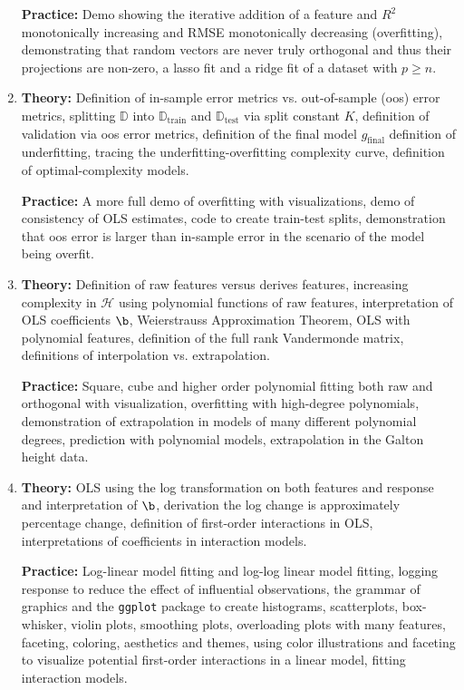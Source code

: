 \begin{enumerate}[(1)]
\textbf{Practice:} Demo showing the iterative addition of a feature and $R^2$ monotonically increasing and RMSE monotonically decreasing (overfitting), demonstrating that random vectors are never truly orthogonal and thus their projections are non-zero, a lasso fit and a ridge fit of a dataset with $p \geq n$.

\item \textbf{Theory:} Definition of in-sample error metrics vs. out-of-sample (oos) error metrics, splitting $\mathbb{D}$ into $\mathbb{D}_{\text{train}}$ and $\mathbb{D}_{\text{test}}$ via split constant $K$, definition of  validation via oos error metrics, definition of the final model $g_{\text{final}}$ definition of underfitting, tracing the underfitting-overfitting complexity curve, definition of optimal-complexity models.

\textbf{Practice:} A more full demo of overfitting with visualizations, demo of consistency of OLS estimates, code to create train-test splits, demonstration that oos error is larger than in-sample error in the scenario of the model being overfit.

\item \textbf{Theory:} Definition of raw features versus derives features, increasing complexity in $\mathcal{H}$ using polynomial functions of raw features, interpretation of OLS coefficients $\b$, Weierstrauss Approximation Theorem, OLS with polynomial features, definition of the full rank Vandermonde matrix, definitions of interpolation vs. extrapolation.

\textbf{Practice:} Square, cube and higher order polynomial fitting both raw and orthogonal with visualization, overfitting with high-degree polynomials, demonstration of extrapolation in models of many different polynomial degrees, prediction with polynomial models, extrapolation in the Galton height data.

\item \textbf{Theory:} OLS using the log transformation on both features and response and interpretation of $\b$, derivation the log change is approximately percentage change, definition of first-order interactions in OLS, interpretations of coefficients in interaction models.

\textbf{Practice:} Log-linear model fitting and log-log linear model fitting, logging response to reduce the effect of influential observations, the grammar of graphics and the \texttt{ggplot} package to create histograms, scatterplots, box-whisker, violin plots, smoothing plots, overloading plots with many features, faceting, coloring, aesthetics and themes, using color illustrations and faceting to visualize potential first-order interactions in a linear model, fitting interaction models.


\end{enumerate}
